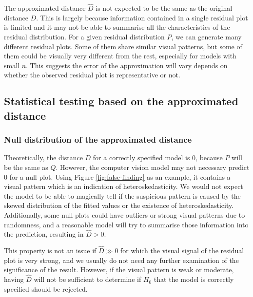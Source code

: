\documentclass[]{interact}
\theoremstyle{plain}%
\theoremstyle{definition}
\theoremstyle{remark}
\begin{document}
The approximated distance \(\hat{D}\) is not expected to be the same as
the original distance \(D\). This is largely because information
contained in a single residual plot is limited and it may not be able to
summarise all the characteristics of the residual distribution. For a
given residual distribution \(P\), we can generate many different
residual plots. Some of them share similar visual patterns, but some of
them could be visually very different from the rest, especially for
models with small \(n\). This suggests the error of the approximation
will vary depends on whether the observed residual plot is
representative or not.

\hypertarget{statistical-testing-based-on-the-approximated-distance}{%
\subsection{Statistical testing based on the approximated
distance}\label{statistical-testing-based-on-the-approximated-distance}}

\hypertarget{null-distribution-of-the-approximated-distance}{%
\subsubsection{Null distribution of the approximated
distance}\label{null-distribution-of-the-approximated-distance}}

Theoretically, the distance \(D\) for a correctly specified model is
\(0\), because \(P\) will be the same as \(Q\). However, the computer
vision model may not necessary predict \(0\) for a null plot. Using
Figure \ref{fig:false-finding} as an example, it contains a visual
pattern which is an indication of heteroskedasticity. We would not
expect the model to be able to magically tell if the suspicious pattern
is caused by the skewed distribution of the fitted values or the
existence of heteroskedasticity. Additionally, some null plots could
have outliers or strong visual patterns due to randomness, and a
reasonable model will try to summarise those information into the
prediction, resulting in \(\hat{D} > 0\).

This property is not an issue if \(\hat{D} \gg 0\) for which the visual
signal of the residual plot is very strong, and we usually do not need
any further examination of the significance of the result. However, if
the visual pattern is weak or moderate, having \(\hat{D}\) will not be
sufficient to determine if \(H_0\) that the model is correctly specified
should be rejected.
\end{document}
